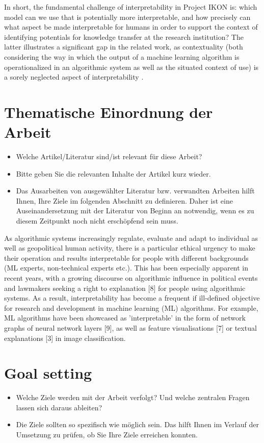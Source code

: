 \documentclass[pdftex,a4paper,12pt]{scrartcl}
\begin{document}
In short, the fundamental challenge of interpretability in Project IKON is: which model can we use that is potentially more interpretable, and how precisely can what aspect be made interpretable for humans in order to support the context of identifying potentials for knowledge transfer at the research institution? The latter illustrates a significant gap in the related work, as contextuality (both considering the way in which the output of a machine learning algorithm is operationalized in an algorithmic system as well as the situated context of use) is a sorely neglected aspect of interpretability \cite{millerExplanationArtificialIntelligence2017}.

\section{Thematische Einordnung der Arbeit}
\begin{itemize}
	\item Welche Artikel/Literatur sind/ist relevant für diese Arbeit? 
	\item Bitte geben Sie die relevanten Inhalte der Artikel kurz wieder.
	\item Das Ausarbeiten von ausgewählter Literatur bzw. verwandten Arbeiten hilft Ihnen, Ihre Ziele im folgenden Abschnitt zu definieren. Daher ist eine Auseinandersetzung mit der Literatur von Beginn an notwendig, wenn es zu diesem Zeitpunkt noch nicht erschöpfend sein muss.
\end{itemize}

As algorithmic systems increasingly regulate, evaluate and adapt to individual as well as geopolitical human activity, there is a particular ethical urgency to make their operation and results interpretable for people with different backgrounds (ML experts, non-technical experts etc.). This has been especially apparent in recent years, with a growing discourse on algorithmic influence in political events and lawmakers seeking a right to explanation [8] for people using algorithmic systems. As a result, interpretability has become a frequent if ill-defined \cite{liptonMythosModelInterpretability2016} objective for research and development in machine learning (ML) algorithms. For example, ML algorithms have been showcased as 'interpretable' in the form of network graphs of neural network layers [9], as well as feature visualisations [7] or textual explanations [3] in image classification.

\section{Goal setting} 
\begin{itemize}
	\item Welche Ziele werden mit der Arbeit verfolgt? Und welche zentralen Fragen lassen sich daraus ableiten?
	\item Die Ziele sollten so spezifisch wie möglich sein. Das hilft Ihnen im Verlauf der Umsetzung zu prüfen, ob Sie Ihre Ziele erreichen konnten.
\end{itemize}
\end{document}
